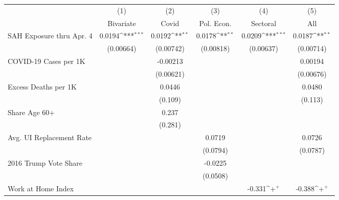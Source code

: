 {
\def\sym#1{\ifmmode^{#1}\else\(^{#1}\)\fi}
\begin{tabular}{l*{5}{c}}
\hline\hline
            &\multicolumn{1}{c}{(1)}         &\multicolumn{1}{c}{(2)}         &\multicolumn{1}{c}{(3)}         &\multicolumn{1}{c}{(4)}         &\multicolumn{1}{c}{(5)}         \\
            &   Bivariate         &       Covid         &  Pol. Econ.         &    Sectoral         &         All         \\
\hline
SAH Exposure thru Apr. 4&      0.0194\sym{***}&      0.0192\sym{**} &      0.0178\sym{**} &      0.0209\sym{***}&      0.0187\sym{**} \\
            &   (0.00664)         &   (0.00742)         &   (0.00818)         &   (0.00637)         &   (0.00714)         \\
COVID-19 Cases per 1K&                     &    -0.00213         &                     &                     &     0.00194         \\
            &                     &   (0.00621)         &                     &                     &   (0.00676)         \\
Excess Deaths per 1K&                     &      0.0446         &                     &                     &      0.0480         \\
            &                     &     (0.109)         &                     &                     &     (0.113)         \\
Share Age 60+&                     &       0.237         &                     &                     &                     \\
            &                     &     (0.281)         &                     &                     &                     \\
Avg. UI Replacement Rate&                     &                     &      0.0719         &                     &      0.0726         \\
            &                     &                     &    (0.0794)         &                     &    (0.0787)         \\
2016 Trump Vote Share&                     &                     &     -0.0225         &                     &                     \\
            &                     &                     &    (0.0508)         &                     &                     \\
Work at Home Index&                     &                     &                     &      -0.331\sym{+}  &      -0.388\sym{+}  \\

\end{tabular}}
